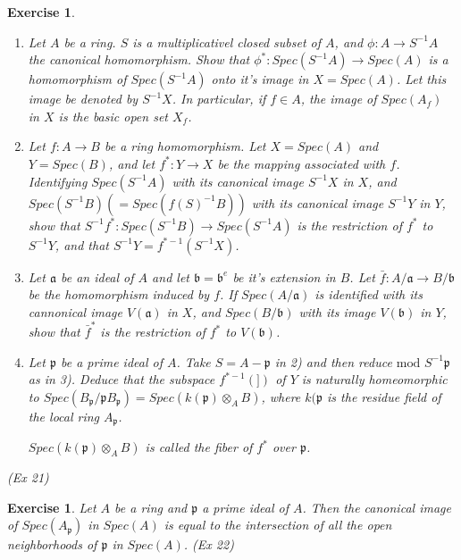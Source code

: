 \documentclass[]{report}
\newtheorem{exercise}[theorem]{Exercise}
\begin{document}
\begin{exercise}
    \begin{enumerate}
        \item Let $A$ be a ring. $S$ is a multiplicativel closed subset of $A$, and $\phi: A\rightarrow S^{-1}A$ the canonical homomorphism. Show that $\phi^*: Spec(S^{-1}A) \rightarrow Spec(A)$ is a homomorphism of $Spec(S^{-1}A)$ onto it's image in $X = Spec(A)$. Let this image be denoted by $S^{-1}X$.    
    In particular, if $f\in A$, the image of $Spec(A_f)$ in $X$ is the basic open set $X_f$. 
        \item Let $f:A \rightarrow B$ be a ring homomorphism. Let $X = Spec(A)$ and $Y = Spec(B)$, and let $f^*: Y\rightarrow X$ be the mapping associated with $f$. Identifying $Spec(S^{-1}A)$ with its canonical image $S^{-1}X$ in $X$, and $Spec(S^{-1}B) (= Spec (f(S)^{-1}B))$ with its canonical image $S^{-1}Y$ in $Y$, show that $S^{-1}f^*: Spec(S^{-1}B)\rightarrow Spec(S^{-1}A)$ is the restriction of $f^*$ to $S^{-1}Y$, and that $S^{-1}Y = f^{*-1}(S^{-1}X)$.
        \item Let $\mathfrak{a}$ be an ideal of $A$ and let $\mathfrak{b} = \mathfrak{b}^e$ be it's extension in $B$. Let $\bar{f}:A/\mathfrak{a} \rightarrow B/\mathfrak{b}$ be the homomorphism induced by $f$. If $Spec(A/\mathfrak{a})$ is identified with its cannonical image $V(\mathfrak{a})$ in $X$, and $Spec(B/\mathfrak{b})$ with its image $V(\mathfrak{b})$ in $Y$, show that $\bar{f}^*$ is the restriction of $f^*$ to $V(\mathfrak{b})$.
        \item Let $\mathfrak{p}$ be a prime ideal of $A$. Take $S = A - \mathfrak{p}$ in 2) and then reduce $\text{mod } S^{-1}\mathfrak{p}$ as in 3). Deduce that the subspace $f^{*-1}(\mathfrak{]})$ of $Y$ is naturally homeomorphic to $Spec(B_\mathfrak{p}/\mathfrak{p}B_\mathfrak{p}) = Spec(k(\mathfrak{p}) \otimes_A B)$, where $k(\mathfrak{p}$ is the residue field of the local ring $A_\mathfrak{p}$.

            $Spec(k(\mathfrak{p}) \otimes_A B)$ is called the fiber of $f^*$ over $\mathfrak{p}$. 
    \end{enumerate}
    (Ex 21)
\end{exercise}

\begin{exercise}
    Let $A$ be a ring and $\mathfrak{p}$ a prime ideal of $A$. Then the canonical image of $Spec(A_\mathfrak{p})$ in $Spec(A)$ is equal to the intersection of all the open neighborhoods of $\mathfrak{p}$ in $Spec(A)$. 
    (Ex 22)
\end{exercise}
\end{document}
